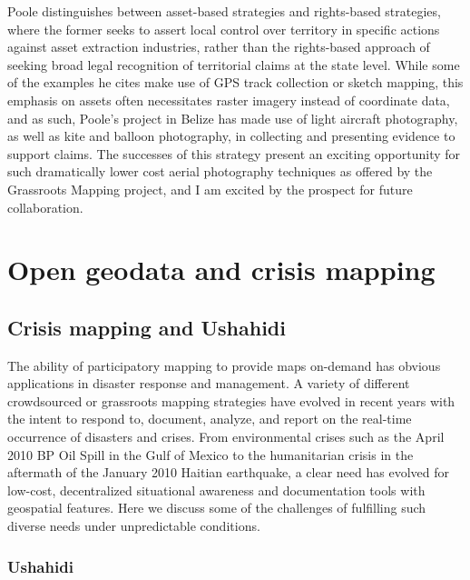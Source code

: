 \documentclass[11pt,oneside,notitlepage]{report}
\begin{document}
Poole distinguishes between asset-based strategies and rights-based strategies, where the former seeks to assert local control over territory in specific actions against asset extraction industries, rather than the rights-based approach of seeking broad legal recognition of territorial claims at the state level. \cite{poole2006there} While some of the examples he cites make use of GPS track collection or sketch mapping, this emphasis on assets often necessitates raster imagery instead of coordinate data, and as such, Poole's project in Belize has made use of light aircraft photography, as well as kite and balloon photography, in collecting and presenting evidence to support claims. \cite{poole2007belize} The successes of this strategy present an exciting opportunity for such dramatically lower cost aerial photography techniques as offered by the Grassroots Mapping project, and I am excited by the prospect for future collaboration.

\section{Open geodata and crisis mapping}
\subsection{Crisis mapping and Ushahidi}

The ability of participatory mapping to provide maps on-demand has obvious applications in disaster response and management. A variety of different crowdsourced or grassroots mapping strategies have evolved in recent years with the intent to respond to, document, analyze, and report on the real-time occurrence of disasters and crises. From environmental crises such as the April 2010 BP Oil Spill in the Gulf of Mexico to the humanitarian crisis in the aftermath of the January 2010 Haitian earthquake, a clear need has evolved for low-cost, decentralized situational awareness and documentation tools with geospatial features. Here we discuss some of the challenges of fulfilling such diverse needs under unpredictable conditions.

\subsubsection{Ushahidi}
\end{document}
